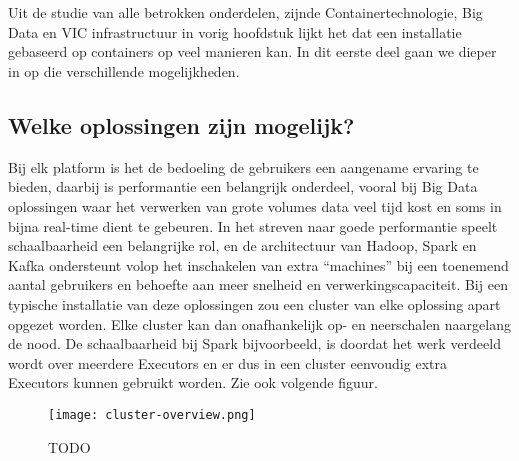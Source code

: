 
\chapter{}%
\label{ch:methodologie}




Uit de studie van alle betrokken onderdelen, zijnde Containertechnologie, Big Data en VIC infrastructuur in vorig hoofdstuk lijkt het dat een installatie gebaseerd op containers op veel manieren kan. In dit eerste deel gaan we dieper in op die verschillende mogelijkheden.

\section{Welke oplossingen zijn mogelijk?}

Bij elk platform is het de bedoeling de gebruikers een aangename ervaring te bieden, daarbij is performantie een belangrijk onderdeel, vooral bij Big Data oplossingen waar het verwerken van grote volumes data veel tijd kost en soms in bijna real-time dient te gebeuren.
In het streven naar goede performantie speelt schaalbaarheid een belangrijke rol, en de architectuur van Hadoop, Spark en Kafka ondersteunt volop het inschakelen van extra ``machines'' bij een toenemend aantal gebruikers en behoefte aan meer snelheid en verwerkingscapaciteit.
Bij een typische installatie van deze oplossingen zou een cluster van elke oplossing apart opgezet worden. Elke cluster kan dan onafhankelijk op- en neerschalen naargelang de nood.
\newline
De schaalbaarheid bij Spark bijvoorbeeld, is doordat het werk verdeeld wordt over meerdere Executors en er dus in een cluster eenvoudig extra Executors kunnen gebruikt worden. Zie ook volgende figuur.
\newline
\begin{figure}
    \texttt{[image: cluster-overview.png]}
    \caption{TODO \autocite{Spark2023e}}
\end{figure}

